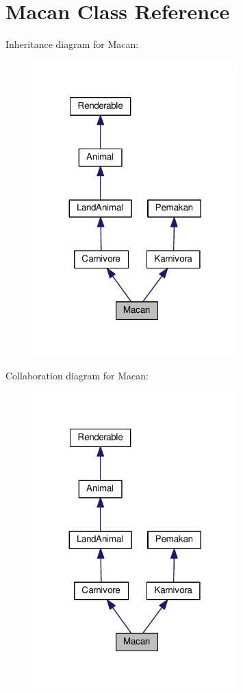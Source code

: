 \hypertarget{classMacan}{}\section{Macan Class Reference}
\label{classMacan}


Inheritance diagram for Macan\+:
\nopagebreak
\begin{figure}[H]
\begin{center}
\leavevmode
\includegraphics[width=224pt]{classMacan__inherit__graph}
\end{center}
\end{figure}


Collaboration diagram for Macan\+:
\nopagebreak
\begin{figure}[H]
\begin{center}
\leavevmode
\includegraphics[width=224pt]{classMacan__coll__graph}
\end{center}
\end{figure}
